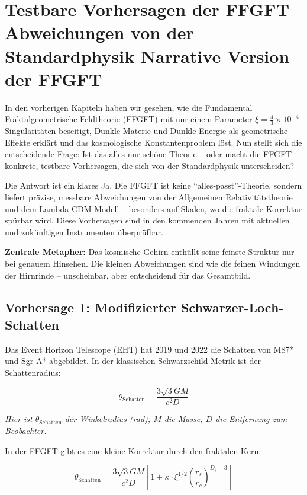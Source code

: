 \chapter{Testbare Vorhersagen der FFGFT  Abweichungen von der Standardphysik  Narrative Version der FFGFT}


	
	In den vorherigen Kapiteln haben wir gesehen, wie die Fundamental Fraktalgeometrische Feldtheorie (FFGFT) mit nur einem Parameter \(\xi = \frac{4}{3} \times 10^{-4}\) Singularitäten beseitigt, Dunkle Materie und Dunkle Energie als geometrische Effekte erklärt und das kosmologische Konstantenproblem löst. Nun stellt sich die entscheidende Frage: Ist das alles nur schöne Theorie – oder macht die FFGFT konkrete, testbare Vorhersagen, die sich von der Standardphysik unterscheiden?
	
	Die Antwort ist ein klares Ja. Die FFGFT ist keine \enquote{alles-passt}-Theorie, sondern liefert präzise, messbare Abweichungen von der Allgemeinen Relativitätstheorie und dem Lambda-CDM-Modell – besonders auf Skalen, wo die fraktale Korrektur spürbar wird. Diese Vorhersagen sind in den kommenden Jahren mit aktuellen und zukünftigen Instrumenten überprüfbar.
	
	\textbf{Zentrale Metapher:} Das kosmische Gehirn enthüllt seine feinste Struktur nur bei genauem Hinsehen. Die kleinen Abweichungen sind wie die feinen Windungen der Hirnrinde – unscheinbar, aber entscheidend für das Gesamtbild.
	
	\section{Vorhersage 1: Modifizierter Schwarzer-Loch-Schatten}
	
	Das Event Horizon Telescope (EHT) hat 2019 und 2022 die Schatten von M87* und Sgr A* abgebildet. In der klassischen Schwarzschild-Metrik ist der Schattenradius:
	
	\begin{equation}
		\theta_{\text{Schatten}} = \frac{3\sqrt{3} G M}{c^2 D}
	\end{equation}
	
	\textit{Hier ist \(\theta_{\text{Schatten}}\) der Winkelradius (rad), \(M\) die Masse, \(D\) die Entfernung zum Beobachter.}
	
	In der FFGFT gibt es eine kleine Korrektur durch den fraktalen Kern:
	
	\begin{equation}
		\theta_{\text{Schatten}} = \frac{3\sqrt{3} G M}{c^2 D} \left[1 + \kappa \cdot \xi^{1/2} \left(\frac{r_s}{r_c}\right)^{D_f - 3}\right]
	\end{equation}
	
